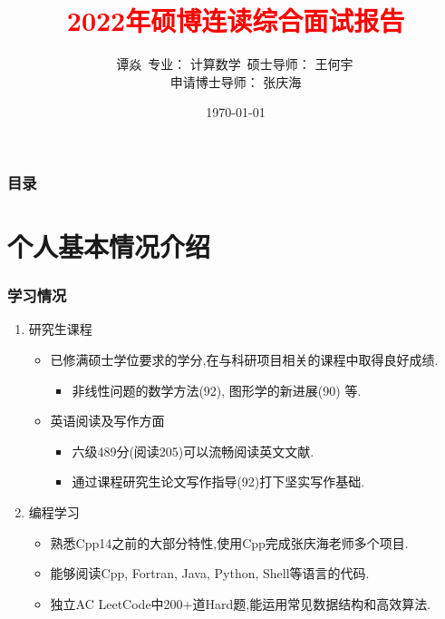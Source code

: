 \documentclass[UTF8]{ctexbeamer}	%
\title{\textcolor{red}{2022年硕博连读综合面试报告}}
\author{谭焱\, \newline   \newline \small{专业： 计算数学}\, 
\newline \newline
 \small{硕士导师： 王何宇\, \\
 申请博士导师： 张庆海}}
\institute{浙江大学数学科学学院}
\date{\today}
\theoremstyle{plain}
\theoremstyle{definition}
\newtheorem{emt}{}[section]
\theoremstyle{remark}
\numberwithin{equation}{section}
\begin{document}

\begin{frame}
\titlepage
\end{frame}


\begin{frame}
    \frametitle{目录}
    \tableofcontents
  \end{frame}

\section{个人基本情况介绍}


        


\begin{frame}[fragile]
    \frametitle{学习情况}
\begin{enumerate}
    \item 研究生课程
    \begin{itemize}
        \item 已修满硕士学位要求的学分,在与科研项目相关的课程中取得良好成绩.
        \begin{itemize}
            \item 非线性问题的数学方法(92), 图形学的新进展(90) 等.
        \end{itemize}
        \item 英语阅读及写作方面
        \begin{itemize}
            \item 六级489分(阅读205)可以流畅阅读英文文献.
            \item 通过课程研究生论文写作指导(92)打下坚实写作基础.
        \end{itemize}
    \end{itemize}
    \item 编程学习
    \begin{itemize}
        \item 熟悉Cpp14之前的大部分特性,使用Cpp完成张庆海老师多个项目.
        \item 能够阅读Cpp, Fortran, Java, Python, Shell等语言的代码.
        \item 独立AC LeetCode中200+道Hard题,能运用常见数据结构和高效算法.
    \end{itemize}
\end{enumerate}
\end{frame}
\end{document}
